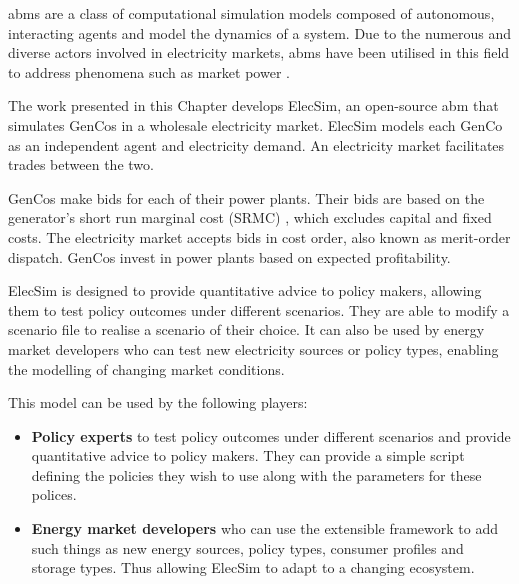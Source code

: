 \acrfull{abm}s are a class of computational simulation models composed of autonomous, interacting agents and model the dynamics of a system. Due to the numerous and diverse actors involved in electricity markets, \acrshort{abm}s have been utilised in this field to address phenomena such as market power \cite{Ringler2016a}. 

The work presented in this Chapter develops ElecSim, an open-source \acrshort{abm} that simulates GenCos in a wholesale electricity market. ElecSim models each GenCo as an independent agent and electricity demand. An electricity market facilitates trades between the two. 

GenCos make bids for each of their power plants. Their bids are based on the generator's short run marginal cost (SRMC) \cite{Perloff2012}, which excludes capital and fixed costs. The electricity market accepts bids in cost order, also known as merit-order dispatch. GenCos invest in power plants based on expected profitability.	

ElecSim is designed to provide quantitative advice to policy makers, allowing them to test policy outcomes under different scenarios. They are able to modify a scenario file to realise a scenario of their choice. It can also be used by energy market developers who can test new electricity sources or policy types, enabling the modelling of changing market conditions.

 This model can be used by the following players:
 
 \begin{itemize}
 \item {\bf Policy experts} to test policy outcomes under different scenarios and provide quantitative advice to policy makers. They can provide a simple script defining the policies they wish to use along with the parameters for these polices.
 \item {\bf Energy market developers} who can use the extensible framework to add such things as new energy sources, policy types, consumer profiles and storage types. Thus allowing ElecSim to adapt to a changing ecosystem.
 \end{itemize}
 




